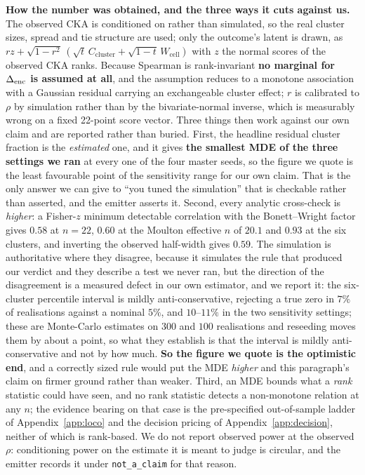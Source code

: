 \textbf{How the number was obtained, and the three ways it cuts against us.} The
observed CKA is conditioned on rather than simulated, so the real cluster sizes,
spread and tie structure are used; only the outcome's latent is drawn, as
$r z + \sqrt{1-r^2}\,(\sqrt{t}\,C_\text{cluster} + \sqrt{1-t}\,W_\text{cell})$
with $z$ the normal scores of the observed CKA ranks. Because Spearman is
rank-invariant \textbf{no marginal for $\Delta_\text{enc}$ is assumed at all}, and the
assumption reduces to a monotone association with a Gaussian residual carrying an
exchangeable cluster effect; $r$ is calibrated to $\rho$ by simulation rather than
by the bivariate-normal inverse, which is measurably wrong on a fixed 22-point
score vector. Three things then work against our own claim and are reported rather
than buried. First, the headline residual cluster fraction is the \emph{estimated}
one, and it gives \textbf{the smallest MDE of the three settings we ran} at every
one of the four master seeds, so the figure we quote is the least favourable point
of the sensitivity range for our own claim.  That is the only answer we can give
to ``you tuned the simulation'' that is checkable rather than asserted, and the
emitter asserts it. Second, every analytic
cross-check is \emph{higher}: a Fisher-$z$ minimum detectable correlation with the
Bonett--Wright factor gives $0.58$ at $n{=}22$, $0.60$ at the Moulton effective
$n$ of $20.1$ and $0.93$ at the six clusters, and inverting the observed
half-width gives $0.59$. The simulation is authoritative where they disagree,
because it simulates the rule that produced our verdict and they describe a test
we never ran, but the direction of the disagreement is a measured defect in our
own estimator, and we report it: the six-cluster percentile interval is mildly
anti-conservative, rejecting a true zero in $7\%$ of realisations against a
nominal $5\%$, and $10$--$11\%$ in the two sensitivity settings; these are
Monte-Carlo estimates on $300$ and $100$ realisations and reseeding moves them by
about a point, so what they establish is that the interval is mildly
anti-conservative and not by how much. \textbf{So the figure we quote is the
optimistic end}, and a correctly sized rule would put the MDE \emph{higher} and
this paragraph's claim on firmer ground rather than weaker. Third, an MDE bounds
what a \emph{rank}
statistic could have seen, and no rank statistic detects a non-monotone relation
at any $n$; the evidence bearing on that case is the pre-specified out-of-sample
ladder of Appendix~\ref{app:loco} and the decision pricing of
Appendix~\ref{app:decision}, neither of which is rank-based. We do not report
observed power at the observed $\rho$: conditioning power on the estimate it is
meant to judge is circular, and the emitter records it under
\texttt{not\_a\_claim} for that reason.

